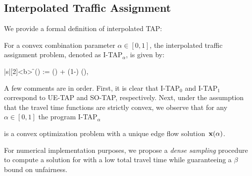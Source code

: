 \documentclass{article}
\newif\ifarxiv   %
\begin{document}

\subsection{Interpolated Traffic Assignment} \label{sec:algos}

We provide a formal definition of interpolated TAP:

\begin{definition} [I-TAP] \label{def:interpolated-TAP}
For a convex combination parameter $\alpha \in [0, 1]$, the interpolated traffic assignment problem, denoted as I-TAP$_{\alpha}$, is given by:
\begin{mini!}|s|[2]<b>
	{\f}{\objitap(\x) := \alpha \objso(\x) + (1-\alpha) \objue(\x), \label{eq:interpolated-TAP-Obj}}
	{}
	{}
\end{mini!}
\begin{comment}
\begin{mini!}|s|[2]<b>
	{\f \in \Omega}{\objitap(\x) := \alpha \objso(\x) + (1-\alpha) \objue(\x), \label{eq:interpolated-TAP-Obj}}
	{}
	{}
\end{mini!}
\end{comment}
\end{definition}

A few comments are in order. First, it is clear that I-TAP$_0$ and I-TAP$_1$ correspond to UE-TAP and SO-TAP, respectively. Next, under the assumption that the travel time functions are strictly convex, we observe that for any $\alpha\in [0,1]$ the program I-TAP$_\alpha$ 
\ifarxiv 
has a strictly convex objective with linear constraints, and so I-TAP$_\alpha$ 
\fi 
is a convex optimization problem with a unique edge flow solution~$\mathbf{x}(\alpha)$.



For numerical implementation purposes, we propose a \emph{dense sampling} procedure to compute a solution for \fso with a low total travel time while guaranteeing a $\beta$ bound on unfairness.
\ifarxiv
\end{document}
